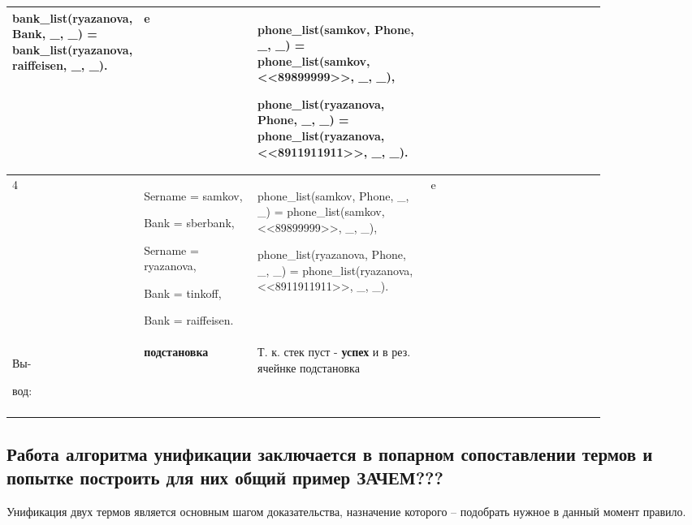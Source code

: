 \documentclass[a4paper,12pt]{article}
\begin{document}
\begin{center}
\begin{longtable}[h!]{|p{0.025\linewidth}|p{0.2\linewidth}|p{ 0.3\linewidth}|p{ 0.025\linewidth}|p{ 0.3\linewidth}|}
{				bank\_list(ryazanova, Bank, \_, \_) = bank\_list(ryazanova, raiffeisen, \_, \_).} & {e} & {phone\_list(samkov, Phone, \_, \_) = phone\_list(samkov, <<89899999>>, \_, \_),
				
				phone\_list(ryazanova, Phone, \_, \_) = phone\_list(ryazanova, <<8911911911>>, \_, \_).}\\
			\hline
			{4} & {Sername = samkov,
				
				Bank = sberbank,
				
				Sername = ryazanova,
				
				Bank = tinkoff,
				
				Bank = raiffeisen.} & {phone\_list(samkov, Phone, \_, \_) = phone\_list(samkov, <<89899999>>, \_, \_),
				
				phone\_list(ryazanova, Phone, \_, \_) = phone\_list(ryazanova, <<8911911911>>, \_, \_).} & {e} & {}\\
			\hline
			{Вы-
				
				вод:} & {\bf подстановка} & {Т. к. стек пуст - {\bf успех} и в рез. ячейнке подстановка} & {} & {}\\
			\hline
			\label{m4}
		\end{longtable}
	\end{center}

	\subsection*{Работа алгоритма унификации заключается в попарном сопоставлении термов и попытке построить для них общий пример    ЗАЧЕМ???}
	
	Унификация двух термов является основным шагом доказательства, назначение которого – подобрать нужное в данный момент правило.
	
	
	
\end{document}

